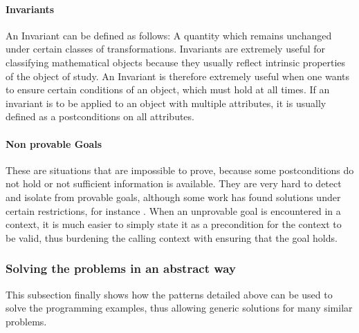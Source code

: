 \paragraph{Invariants} \label{invariants}
An Invariant can be defined as follows: A quantity which remains unchanged under certain classes of transformations. Invariants are extremely useful for classifying mathematical objects because they usually reflect intrinsic properties of the object of study.\cite[282ff]{hunt}
\newline An Invariant is therefore extremely useful when one wants to ensure certain conditions of an object, which must hold at all times. If an invariant is to be applied to an object with multiple attributes, it is usually defined as a postconditions on all attributes. 

\paragraph{Non provable Goals} \label{non provable goal}
These are situations that are impossible to prove, because some postconditions do not hold or not sufficient information is available. They are very hard to detect and isolate from provable goals, although some work has found solutions under certain restrictions, for instance \cite{goals}. When an unprovable goal is encountered in a context, it is much easier to simply state it as a precondition for the context to be valid, thus burdening the calling context with ensuring that the goal holds. 

\subsubsection{Solving the problems in an abstract way}
This subsection finally shows how the patterns detailed above can be used to solve the programming examples, thus allowing generic solutions for many similar problems.

